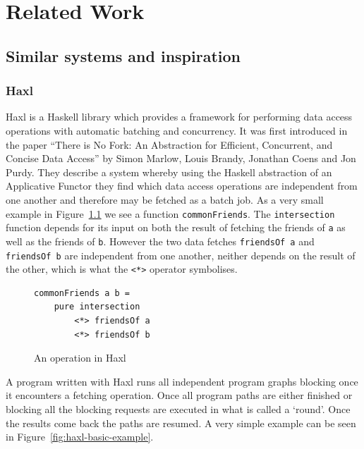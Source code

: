 \chapter{Related Work}

\label{ch:related-work}

\section{Similar systems and inspiration}

\subsection{Haxl}

Haxl\cite{Haxl:library:link}\cite{Marlow:2014:NFA:2692915.2628144} is a Haskell library which provides a framework for performing data access operations with automatic batching and concurrency. It was first introduced in the paper ``There is No Fork: An Abstraction for Efficient, Concurrent, and Concise Data Access''\cite{Marlow:2014:NFA:2692915.2628144} by Simon Marlow, Louis Brandy, Jonathan Coens and Jon Purdy.
They describe a system whereby using the Haskell abstraction of an Applicative Functor\cite{mcbride2008applicative} they find which data access operations are independent from one another and therefore may be fetched as a batch job.
As a very small example in Figure~\ref{fig:operation-in-haxl} we see a function \texttt{commonFriends}.
The \texttt{intersection} function depends for its input on both the result of fetching the friends of \texttt{a} as well as the friends of \texttt{b}.
However the two data fetches \texttt{friendsOf a} and \texttt{friendsOf b} are independent from one another, neither depends on the result of the other, which is what the \texttt{<*>} operator symbolises.

\begin{figure}
\begin{verbatim}
commonFriends a b =
    pure intersection
        <*> friendsOf a
        <*> friendsOf b
\end{verbatim}
\caption{An operation in Haxl}
\label{fig:operation-in-haxl}
\end{figure}

A program written with Haxl runs all independent program graphs blocking once it encounters a fetching operation.
Once all program paths are either finished or blocking all the blocking requests are executed in what is called a `round'.
Once the results come back the paths are resumed.
A very simple example can be seen in Figure~\ref{fig:haxl-basic-example}. 

